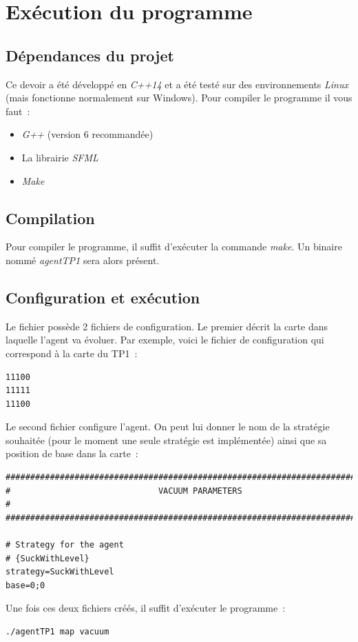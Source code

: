 \documentclass{article}
\begin{document}
\section{Exécution du programme}
\subsection{Dépendances du projet}
Ce devoir a été développé en \emph{C++14} et a été testé sur des environnements \emph{Linux} (mais fonctionne normalement sur Windows). Pour compiler le programme il vous faut~:
\begin{itemize}
    \item \emph{G++} (version 6 recommandée)
    \item La librairie \emph{SFML}
    \item \emph{Make}
\end{itemize}
\subsection{Compilation}
Pour compiler le programme, il suffit d'exécuter la commande \emph{make}. Un binaire nommé \emph{agentTP1} sera alors présent.
\subsection{Configuration et exécution}
Le fichier possède 2 fichiers de configuration. Le premier décrit la carte dans laquelle l'agent va évoluer. Par exemple, voici le fichier de configuration qui correspond à la carte du TP1~:
\begin{verbatim}
11100
11111
11100
\end{verbatim}

Le second fichier configure l'agent. On peut lui donner le nom de la stratégie souhaitée (pour le moment une seule stratégie est implémentée) ainsi que sa position de base dans la carte~:

\begin{verbatim}
###############################################################################
#                              VACUUM PARAMETERS                              #
###############################################################################

# Strategy for the agent
# {SuckWithLevel}
strategy=SuckWithLevel
base=0;0
\end{verbatim}

Une fois ces deux fichiers créés, il suffit d'exécuter le programme~:
\begin{verbatim}
./agentTP1 map vacuum
\end{verbatim}
\end{document}
